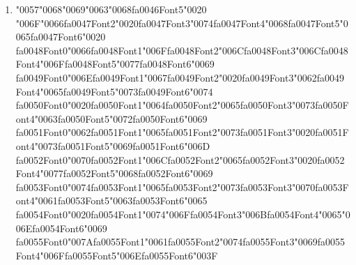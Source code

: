 \documentclass[11pt]{article}
\begin{document}
\begin{enumerate}[label=Q\arabic*., leftmargin=*]
\item {\char"0057}{\char"0068}{\char"0069}{\char"0063}{\char"0068}{\csname fa0046Font5\endcsname\char"0020} {\char"006F}{\char"0066}{\csname fa0047Font2\endcsname\char"0020}{\csname fa0047Font3\endcsname\char"0074}{\csname fa0047Font4\endcsname\char"0068}{\csname fa0047Font5\endcsname\char"0065}{\csname fa0047Font6\endcsname\char"0020} {\csname fa0048Font0\endcsname\char"0066}{\csname fa0048Font1\endcsname\char"006F}{\csname fa0048Font2\endcsname\char"006C}{\csname fa0048Font3\endcsname\char"006C}{\csname fa0048Font4\endcsname\char"006F}{\csname fa0048Font5\endcsname\char"0077}{\csname fa0048Font6\endcsname\char"0069} {\csname fa0049Font0\endcsname\char"006E}{\csname fa0049Font1\endcsname\char"0067}{\csname fa0049Font2\endcsname\char"0020}{\csname fa0049Font3\endcsname\char"0062}{\csname fa0049Font4\endcsname\char"0065}{\csname fa0049Font5\endcsname\char"0073}{\csname fa0049Font6\endcsname\char"0074} {\csname fa0050Font0\endcsname\char"0020}{\csname fa0050Font1\endcsname\char"0064}{\csname fa0050Font2\endcsname\char"0065}{\csname fa0050Font3\endcsname\char"0073}{\csname fa0050Font4\endcsname\char"0063}{\csname fa0050Font5\endcsname\char"0072}{\csname fa0050Font6\endcsname\char"0069} {\csname fa0051Font0\endcsname\char"0062}{\csname fa0051Font1\endcsname\char"0065}{\csname fa0051Font2\endcsname\char"0073}{\csname fa0051Font3\endcsname\char"0020}{\csname fa0051Font4\endcsname\char"0073}{\csname fa0051Font5\endcsname\char"0069}{\csname fa0051Font6\endcsname\char"006D} {\csname fa0052Font0\endcsname\char"0070}{\csname fa0052Font1\endcsname\char"006C}{\csname fa0052Font2\endcsname\char"0065}{\csname fa0052Font3\endcsname\char"0020}{\csname fa0052Font4\endcsname\char"0077}{\csname fa0052Font5\endcsname\char"0068}{\csname fa0052Font6\endcsname\char"0069} {\csname fa0053Font0\endcsname\char"0074}{\csname fa0053Font1\endcsname\char"0065}{\csname fa0053Font2\endcsname\char"0073}{\csname fa0053Font3\endcsname\char"0070}{\csname fa0053Font4\endcsname\char"0061}{\csname fa0053Font5\endcsname\char"0063}{\csname fa0053Font6\endcsname\char"0065} {\csname fa0054Font0\endcsname\char"0020}{\csname fa0054Font1\endcsname\char"0074}{\char"006F}{\csname fa0054Font3\endcsname\char"006B}{\csname fa0054Font4\endcsname\char"0065}{\char"006E}{\csname fa0054Font6\endcsname\char"0069} {\csname fa0055Font0\endcsname\char"007A}{\csname fa0055Font1\endcsname\char"0061}{\csname fa0055Font2\endcsname\char"0074}{\csname fa0055Font3\endcsname\char"0069}{\csname fa0055Font4\endcsname\char"006F}{\csname fa0055Font5\endcsname\char"006E}{\csname fa0055Font6\endcsname\char"003F}


\end{enumerate}
\end{document}
